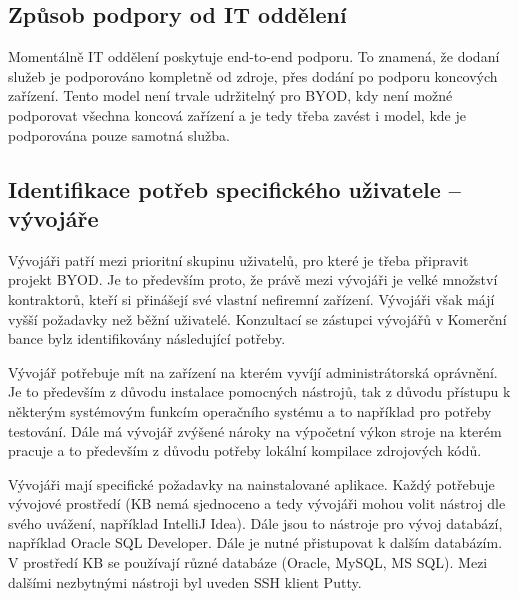 \subsection{Způsob podpory od IT oddělení}
Momentálně IT oddělení poskytuje end-to-end podporu. To znamená, že dodaní služeb je podporováno kompletně od zdroje, přes dodání po podporu koncových zařízení. Tento model není trvale udržitelný pro BYOD, kdy není možné podporovat všechna koncová zařízení a je tedy třeba zavést i model, kde je podporována pouze samotná služba.

\subsection{Identifikace potřeb specifického uživatele -- vývojáře}
Vývojáři patří mezi prioritní skupinu uživatelů, pro které je třeba připravit projekt BYOD. Je to především proto, že právě mezi vývojáři je velké množství kontraktorů, kteří si přinášejí své vlastní nefiremní zařízení. Vývojáři však májí vyšší požadavky než běžní uživatelé. Konzultací se zástupci vývojářů v Komerční bance bylz identifikovány následující potřeby. 

Vývojář potřebuje mít na zařízení na kterém vyvíjí administrátorská oprávnění. Je to především z důvodu instalace pomocných nástrojů, tak z důvodu přístupu k některým systémovým funkcím operačního systému a to například pro potřeby testování. Dále má vývojář zvýšené nároky na výpočetní výkon stroje na kterém pracuje a to především z důvodu potřeby lokální kompilace zdrojových kódů. 

Vývojáři mají specifické požadavky na nainstalované aplikace. Každý potřebuje vývojové prostředí (KB nemá sjednoceno a tedy vývojáři mohou volit nástroj dle svého uvážení, například IntelliJ Idea). Dále jsou to nástroje pro vývoj databází, například Oracle SQL Developer. Dále je nutné přistupovat k dalším databázím. V prostředí KB se používají různé databáze (Oracle, MySQL, MS SQL). Mezi dalšími nezbytnými nástroji byl uveden SSH klient Putty.

